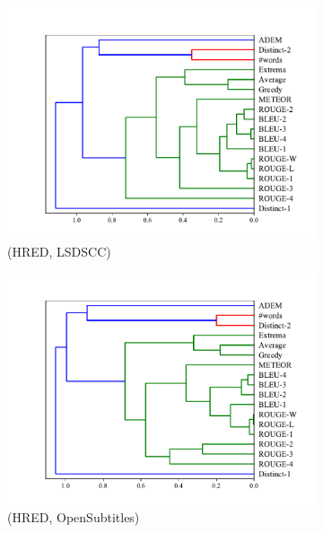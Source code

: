 \begin{figure}[htb]
    \centering
    \begin{subfigure}{0.33\linewidth}
        \centering
        \includegraphics[width=\linewidth]{figure/plot/hierarchy/v2/pearson/hred/lsdscc/plot.pdf}
        \caption{(HRED, LSDSCC)}
    \end{subfigure}%
    \begin{subfigure}{0.33\linewidth}
        \centering
        \includegraphics[width=\linewidth]{figure/plot/hierarchy/v2/pearson/hred/opensub/plot.pdf}
        \caption{(HRED, OpenSubtitles)}
    \end{subfigure}%
    \begin{subfigure}{0.33\linewidth}

\end{subfigure}
\end{figure}
